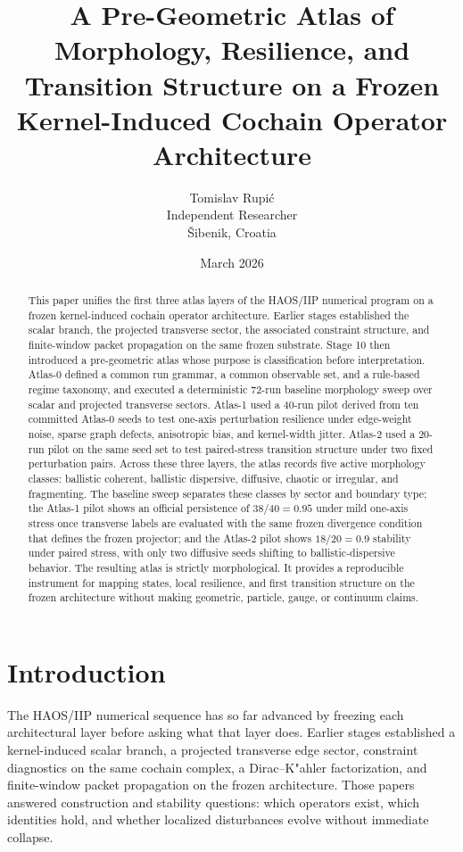 \documentclass[11pt]{article}
\title{A Pre-Geometric Atlas of Morphology, Resilience, and Transition Structure on a Frozen Kernel-Induced Cochain Operator Architecture}
\author{Tomislav Rupi\'c\\Independent Researcher\\\v{S}ibenik, Croatia}
\date{March 2026}
\begin{document}
\maketitle

\begin{abstract}
This paper unifies the first three atlas layers of the HAOS/IIP numerical program on a frozen kernel-induced cochain operator architecture. Earlier stages established the scalar branch, the projected transverse sector, the associated constraint structure, and finite-window packet propagation on the same frozen substrate. Stage 10 then introduced a pre-geometric atlas whose purpose is classification before interpretation. Atlas-0 defined a common run grammar, a common observable set, and a rule-based regime taxonomy, and executed a deterministic 72-run baseline morphology sweep over scalar and projected transverse sectors. Atlas-1 used a 40-run pilot derived from ten committed Atlas-0 seeds to test one-axis perturbation resilience under edge-weight noise, sparse graph defects, anisotropic bias, and kernel-width jitter. Atlas-2 used a 20-run pilot on the same seed set to test paired-stress transition structure under two fixed perturbation pairs. Across these three layers, the atlas records five active morphology classes: ballistic coherent, ballistic dispersive, diffusive, chaotic or irregular, and fragmenting. The baseline sweep separates these classes by sector and boundary type; the Atlas-1 pilot shows an official persistence of $38/40 = 0.95$ under mild one-axis stress once transverse labels are evaluated with the same frozen divergence condition that defines the frozen projector; and the Atlas-2 pilot shows $18/20 = 0.9$ stability under paired stress, with only two diffusive seeds shifting to ballistic-dispersive behavior. The resulting atlas is strictly morphological. It provides a reproducible instrument for mapping states, local resilience, and first transition structure on the frozen architecture without making geometric, particle, gauge, or continuum claims.
\end{abstract}

\section{Introduction}
The HAOS/IIP numerical sequence has so far advanced by freezing each architectural layer before asking what that layer does. Earlier stages established a kernel-induced scalar branch, a projected transverse edge sector, constraint diagnostics on the same cochain complex, a Dirac--K"ahler factorization, and finite-window packet propagation on the frozen architecture. Those papers answered construction and stability questions: which operators exist, which identities hold, and whether localized disturbances evolve without immediate collapse.
\end{document}
